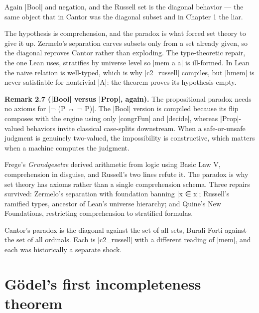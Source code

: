\documentclass{memoir}
\begin{document}
Again \LeanVerb|Bool| and negation, and the Russell set is the diagonal behavior — the
same object that in Cantor was the diagonal subset and in Chapter 1 the liar.

The hypothesis is comprehension, and the paradox is what forced set theory to
give it up. Zermelo's separation carves subsets only from a set already given,
so the diagonal reproves Cantor rather than exploding. The type-theoretic
repair, the one Lean uses, stratifies by universe level so \LeanVerb|mem a a| is
ill-formed. In Lean the naive relation is well-typed, which is why
\LeanVerb|c2_russell| compiles, but \LeanVerb|hmem| is never satisfiable for nontrivial \LeanVerb|A|:
the theorem proves its hypothesis empty.

\textbf{Remark 2.7 (\LeanVerb|Bool| versus \LeanVerb|Prop|, again).} The propositional paradox needs no axioms for
\LeanVerb|¬ (P ↔ ¬ P)|. The \LeanVerb|Bool| version is compiled because its flip composes with the
engine using only \LeanVerb|congrFun| and \LeanVerb|decide|, whereas \LeanVerb|Prop|-valued behaviors
invite classical case-splits downstream. When a safe-or-unsafe judgment is
genuinely two-valued, the impossibility is constructive, which matters when a
machine computes the judgment.

Frege's \emph{Grundgesetze} derived arithmetic from logic using Basic Law V,
comprehension in disguise, and Russell's two lines refute it. The paradox is why
set theory has axioms rather than a single comprehension schema. Three repairs
survived: Zermelo's separation with foundation banning \LeanVerb|x ∈ x|; Russell's
ramified types, ancestor of Lean's universe hierarchy; and Quine's New
Foundations, restricting comprehension to stratified formulas.

Cantor's paradox is the diagonal against the set of all sets, Burali-Forti
against the set of all ordinals. Each is \LeanVerb|c2_russell| with a different
reading of \LeanVerb|mem|, and each was historically a separate shock.



\section{Gödel's first incompleteness theorem}\label{Two--Schemas--of--Impossibility-005F-005F-005F--Machine--Checked--Limits--of--Trustworthy--Machine--Learning-005F-005F-005F--and--Why--They--Tighten--with--Capability----The--Classical--Limits----G-005F-005F-005Fdel-005F-005F-005Fs--first--incompleteness--theorem}
\end{document}

